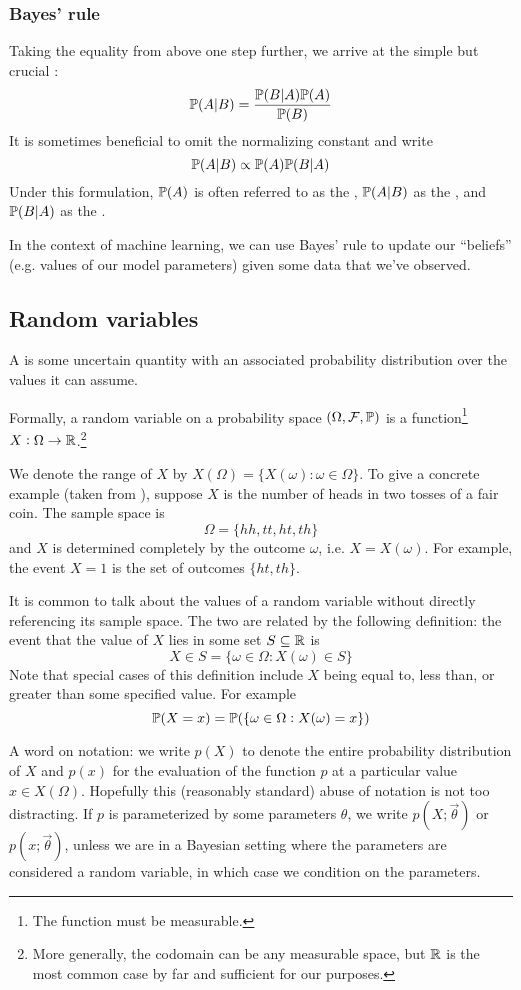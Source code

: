 \subsubsection{Bayes' rule}
Taking the equality from above one step further, we arrive at the simple but crucial :
\[\mathbb{P}(A | B) = \frac{\mathbb{P}(B | A)\mathbb{P}(A)}{\mathbb{P}(B)}\]
It is sometimes beneficial to omit the normalizing constant and write
\[\mathbb{P}(A | B) \propto \mathbb{P}(A)\mathbb{P}(B | A)\]
Under this formulation, $\mathbb{P}(A)$ is often referred to as the , $\mathbb{P}(A | B)$ as the , and $\mathbb{P}(B | A)$ as the .

In the context of machine learning, we can use Bayes' rule to update our ``beliefs'' (e.g. values of our model parameters) given some data that we've observed.

\subsection{Random variables}
A  is some uncertain quantity with an associated probability distribution over the values it can assume.

Formally, a random variable on a probability space $(\Omega, \mathcal{F}, \mathbb{P})$ is a function\footnote{
    The function must be measurable.
} $X: \Omega \to \mathbb{R}$.\footnote{
    More generally, the codomain can be any measurable space, but $\mathbb{R}$ is the most common case by far and sufficient for our purposes.
}

We denote the range of $X$ by $X(\Omega) = \{X(\omega) : \omega \in \Omega\}$.
To give a concrete example (taken from \cite{pitman}), suppose $X$ is the number of heads in two tosses of a fair coin.
The sample space is
\[\Omega = \{hh, tt, ht, th\}\]
and $X$ is determined completely by the outcome $\omega$, i.e. $X = X(\omega)$.
For example, the event $X = 1$ is the set of outcomes $\{ht, th\}$.

It is common to talk about the values of a random variable without directly referencing its sample space.
The two are related by the following definition: the event that the value of $X$ lies in some set $S \subseteq \mathbb{R}$ is
\[X \in S = \{\omega \in \Omega : X(\omega) \in S\}\]
Note that special cases of this definition include $X$ being equal to, less than, or greater than some specified value.
For example
\[\mathbb{P}(X = x) = \mathbb{P}(\{\omega \in \Omega : X(\omega) = x\})\]

A word on notation: we write $p(X)$ to denote the entire probability distribution of $X$ and $p(x)$ for the evaluation of the function $p$ at a particular value $x \in X(\Omega)$.
Hopefully this (reasonably standard) abuse of notation is not too distracting.
If $p$ is parameterized by some parameters $\theta$, we write $p(X; \vec{\theta})$ or $p(x; \vec{\theta})$, unless we are in a Bayesian setting where the parameters are considered a random variable, in which case we condition on the parameters.

